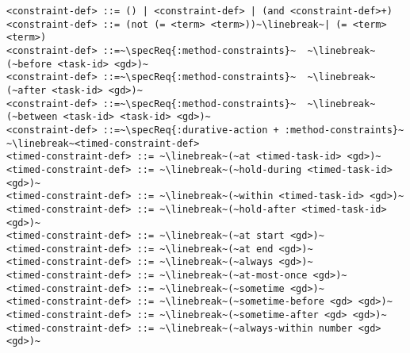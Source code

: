 \documentclass[letterpaper]{article} %
\begin{document}
\begin{lstlisting}[firstnumber=last, escapechar=~]
<constraint-def> ::= () | <constraint-def> | (and <constraint-def>+)
<constraint-def> ::= (not (= <term> <term>))~\linebreak~| (= <term> <term>)
<constraint-def> ::=~\specReq{:method-constraints}~  ~\linebreak~(~before <task-id> <gd>)~
<constraint-def> ::=~\specReq{:method-constraints}~  ~\linebreak~(~after <task-id> <gd>)~
<constraint-def> ::=~\specReq{:method-constraints}~  ~\linebreak~(~between <task-id> <task-id> <gd>)~
<constraint-def> ::=~\specReq{:durative-action + :method-constraints}~ ~\linebreak~<timed-constraint-def>
<timed-constraint-def> ::= ~\linebreak~(~at <timed-task-id> <gd>)~
<timed-constraint-def> ::= ~\linebreak~(~hold-during <timed-task-id> <gd>)~
<timed-constraint-def> ::= ~\linebreak~(~within <timed-task-id> <gd>)~
<timed-constraint-def> ::= ~\linebreak~(~hold-after <timed-task-id> <gd>)~
<timed-constraint-def> ::= ~\linebreak~(~at start <gd>)~
<timed-constraint-def> ::= ~\linebreak~(~at end <gd>)~
<timed-constraint-def> ::= ~\linebreak~(~always <gd>)~
<timed-constraint-def> ::= ~\linebreak~(~at-most-once <gd>)~
<timed-constraint-def> ::= ~\linebreak~(~sometime <gd>)~
<timed-constraint-def> ::= ~\linebreak~(~sometime-before <gd> <gd>)~
<timed-constraint-def> ::= ~\linebreak~(~sometime-after <gd> <gd>)~
<timed-constraint-def> ::= ~\linebreak~(~always-within number <gd> <gd>)~
\end{lstlisting}
\end{document}
